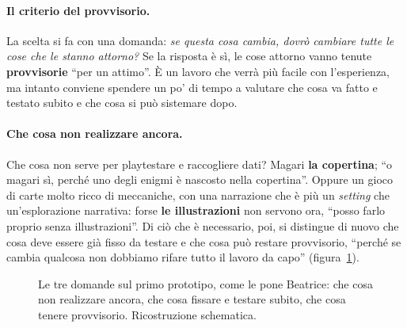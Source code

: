 \paragraph{Il criterio del provvisorio.} La scelta si fa con una domanda: \emph{se
questa cosa cambia, dovrò cambiare tutte le cose che le stanno attorno?} Se la
risposta è sì, le cose attorno vanno tenute \textbf{provvisorie} ``per un attimo''.
È un lavoro che verrà più facile con l'esperienza, ma intanto conviene spendere un
po' di tempo a valutare che cosa va fatto e testato subito e che cosa si può
sistemare dopo.

\paragraph{Che cosa non realizzare ancora.} Che cosa non serve per playtestare e
raccogliere dati? Magari \textbf{la copertina}; ``o magari sì, perché uno degli enigmi
è nascosto nella copertina''. Oppure un gioco di carte molto ricco di meccaniche, con
una narrazione che è più un \emph{setting} che un'esplorazione narrativa: forse
\textbf{le illustrazioni} non servono ora, ``posso farlo proprio senza
illustrazioni''. Di ciò che è necessario, poi, si distingue di nuovo che cosa deve
essere già fisso da testare e che cosa può restare provvisorio, ``perché se cambia
qualcosa non dobbiamo rifare tutto il lavoro da capo'' (figura~\ref{a9:fig:prototipo}).

\begin{figure}[htbp]
\centering
{}
\caption{Le tre domande sul primo prototipo, come le pone Beatrice: che cosa non
realizzare ancora, che cosa fissare e testare subito, che cosa tenere provvisorio.
Ricostruzione schematica.}
\label{a9:fig:prototipo}
\end{figure}

